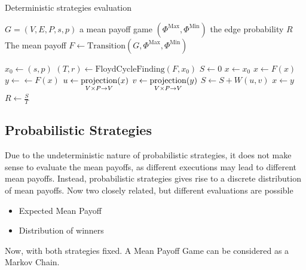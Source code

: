 \begin{algorithm}
	\caption{Deterministic strategies evaluation}\label{alg:DeterministicEvaluation}
	\begin{algorithmic}
		\Require $G=(V,E,P,s,p)$ a mean payoff game
		\Require $(\Phi^{\text{Max}},\Phi^{\text{Min}})$ the edge probability 
		\Ensure $R$ The mean payoff  
		\State $F\leftarrow \text{Transition}(G,\Phi^{\text{Max}},\Phi^{\text{Min}})$

		\State $x_0\leftarrow (s,p)$
		\State $(T,r)\leftarrow \text{FloydCycleFinding}(F,x_0)$ 
		\State $S\leftarrow 0$ 
		\State $x\leftarrow x_0$
		 
			\State $x\leftarrow F(x)$
		\EndFor
			\State $y\leftarrow \leftarrow F(x)$
			\State $u\leftarrow \displaystyle\operatorname*{projection}_{V\times P\rightarrow V}(x)$ 
			\State $v\leftarrow \displaystyle\operatorname*{projection}_{V\times P\rightarrow V}(y)$ 
			\State $S\leftarrow S+W(u,v)$
			\State $x\leftarrow y$
		\EndFor
		\State \Return $R\leftarrow \frac{S}{T}$
	\end{algorithmic}
\end{algorithm}
\FloatBarrier


\subsection{Probabilistic Strategies}
Due to the undeterministic nature of probabilistic strategies, it does not make sense to evaluate the mean payoffs, as different executions may lead to different mean payoffs. \newline
Instead, probabilistic strategies gives rise to a discrete distribution of mean payoffs. \newline
Now two closely related, but different evaluations are possible
\begin{itemize}
	\item Expected Mean Payoff
	\item Distribution of winners 
\end{itemize}
Now, with both strategies fixed. A Mean Payoff Game can be considered as a Markov Chain.

